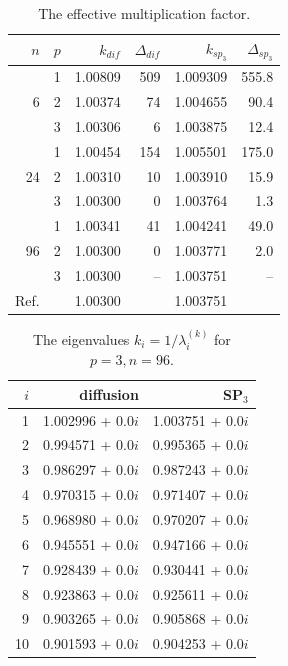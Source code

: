 \documentclass[authoryear]{elsarticle}
\begin{document}
\begin{table}[H]
\caption{The effective multiplication factor.}
\label{tab:iaea_cosym_lambda}
\begin{center}
\begin{tabular}{r r r r r r}
\hline
$n$ & $p$ & $k_{dif}$ & $\Delta_{dif}$ &$k_{sp_3}$& $\Delta_{sp_3}$ \\
\hline
	& 1	& 1.00809& 509& 1.009309& 555.8\\
6	& 2	& 1.00374&  74& 1.004655&  90.4\\
	& 3	& 1.00306&   6& 1.003875&  12.4\\
\hline
	& 1	& 1.00454& 154& 1.005501& 175.0\\
24& 2	& 1.00310&  10& 1.003910&  15.9\\
	& 3	& 1.00300&   0& 1.003764&   1.3\\ 
\hline
	& 1	& 1.00341&  41& 1.004241&  49.0\\
96& 2	& 1.00300&   0& 1.003771&   2.0\\
	& 3	& 1.00300&  --& 1.003751&  --\\ 
\hline
Ref.&   & 1.00300&    & 1.003751&    \\ 
\hline
\end{tabular}
\end{center}
\end{table}

\begin{table}[H]
\caption{The eigenvalues $k_i=1/\lambda_i^{(k)}$ for $p=3, n=96$.}
\label{tab:iaea_cosym_lambda_10}
\begin{center}
\begin{tabular}{rrr}
\hline
$i$ & diffusion & SP$_3$  \\
\hline
1 & 1.002996 + 0.0$i$ & 1.003751 + 0.0$i$\\
2 & 0.994571 + 0.0$i$ & 0.995365 + 0.0$i$\\
3 & 0.986297 + 0.0$i$ & 0.987243 + 0.0$i$\\
4 & 0.970315 + 0.0$i$ & 0.971407 + 0.0$i$\\
5 & 0.968980 + 0.0$i$ & 0.970207 + 0.0$i$\\
6 & 0.945551 + 0.0$i$ & 0.947166 + 0.0$i$\\
7 & 0.928439 + 0.0$i$ & 0.930441 + 0.0$i$\\
8 & 0.923863 + 0.0$i$ & 0.925611 + 0.0$i$\\
9 & 0.903265 + 0.0$i$ & 0.905868 + 0.0$i$\\
10 & 0.901593 + 0.0$i$ & 0.904253 + 0.0$i$\\
\hline
\end{tabular}
\end{center}
\end{table}
\end{document}

